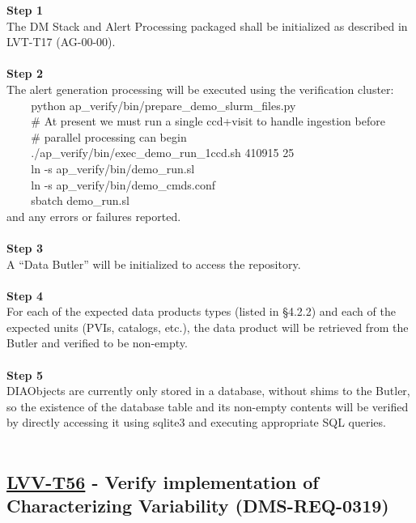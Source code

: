 \textbf{Step 1}\\
The DM Stack and Alert Processing packaged shall be initialized as
described in LVT-T17 (AG-00-00).\\
~\\
\textbf{Step 2}\\
The alert generation processing will be executed using the verification
cluster:\\
\hspace*{0.333em} ~ ~ ~python
ap\_verify/bin/prepare\_demo\_slurm\_files.py\\
\hspace*{0.333em} ~ ~ ~\# At present we must run a single ccd+visit to
handle ingestion before\\
\hspace*{0.333em} ~ ~ ~\# parallel processing can begin\\
\hspace*{0.333em} ~ ~ ~./ap\_verify/bin/exec\_demo\_run\_1ccd.sh 410915
25\\
\hspace*{0.333em} ~ ~ ~ln -s ap\_verify/bin/demo\_run.sl\\
\hspace*{0.333em} ~ ~ ~ln -s ap\_verify/bin/demo\_cmds.conf\\
\hspace*{0.333em} ~ ~ ~sbatch demo\_run.sl\\
and any errors or failures reported.\\
~\\
\textbf{Step 3}\\
A ``Data Butler'' will be initialized to access the repository.\\
~\\
\textbf{Step 4}\\
For each of the expected data products types (listed in §4.2.2) and each
of the expected units (PVIs, catalogs, etc.), the data product will be
retrieved from the Butler and verified to be non-empty.\\
~\\
\textbf{Step 5}\\
DIAObjects are currently only stored in a database, without shims to the
Butler, so the existence of the database table and its non-empty
contents will be verified by directly accessing it using sqlite3 and
executing appropriate SQL queries.\\
~\\

\hypertarget{lvv-t56---verify-implementation-of-characterizing-variability-dms-req-0319}{%
\subsection{\texorpdfstring{\href{https://jira.lsstcorp.org/secure/Tests.jspa\#/testCase/LVV-T56}{LVV-T56}
- Verify implementation of Characterizing Variability
(DMS-REQ-0319)}{LVV-T56 - Verify implementation of Characterizing Variability (DMS-REQ-0319)}}\label{lvv-t56---verify-implementation-of-characterizing-variability-dms-req-0319}}

